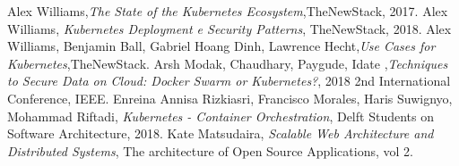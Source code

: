 \documentclass[12pt, a4paper]{report}
\begin{document}
\begin{thebibliography}{9}
Alex Williams,\textit{The State of the Kubernetes Ecosystem},TheNewStack, 2017.
Alex Williams, \textit{Kubernetes Deployment e Security Patterns}, TheNewStack, 2018.
Alex Williams, Benjamin Ball, Gabriel Hoang Dinh, Lawrence Hecht,\textit{Use Cases for Kubernetes},TheNewStack.
Arsh Modak, Chaudhary, Paygude, Idate ,\textit{Techniques to Secure Data on Cloud: Docker Swarm or Kubernetes?}, 2018 2nd International Conference, IEEE.
Enreina Annisa Rizkiasri, Francisco Morales, Haris Suwignyo, Mohammad Riftadi, \textit{Kubernetes - Container Orchestration}, Delft Students on Software Architecture, 2018.
Kate Matsudaira, \textit{Scalable Web Architecture and Distributed Systems}, The architecture of Open Source Applications, vol 2.

\end{thebibliography}
\end{document}
